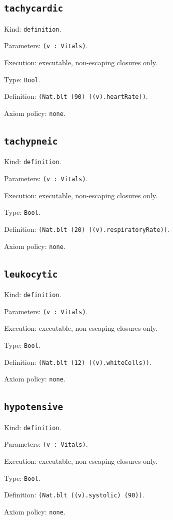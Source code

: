 \documentclass[11pt]{article}
\begin{document}
\subsection*{\texttt{tachycardic}}
\noindent Kind: \texttt{definition}.\par
\noindent Parameters: \texttt{(v : Vitals)}.\par
\noindent Execution: executable, non-escaping closures only.\par
\noindent Type: \texttt{Bool}.\par
\noindent Definition: \texttt{(Nat.blt (90) ((v).heartRate))}.\par
\noindent Axiom policy: \texttt{none}.\par
\subsection*{\texttt{tachypneic}}
\noindent Kind: \texttt{definition}.\par
\noindent Parameters: \texttt{(v : Vitals)}.\par
\noindent Execution: executable, non-escaping closures only.\par
\noindent Type: \texttt{Bool}.\par
\noindent Definition: \texttt{(Nat.blt (20) ((v).respiratoryRate))}.\par
\noindent Axiom policy: \texttt{none}.\par
\subsection*{\texttt{leukocytic}}
\noindent Kind: \texttt{definition}.\par
\noindent Parameters: \texttt{(v : Vitals)}.\par
\noindent Execution: executable, non-escaping closures only.\par
\noindent Type: \texttt{Bool}.\par
\noindent Definition: \texttt{(Nat.blt (12) ((v).whiteCells))}.\par
\noindent Axiom policy: \texttt{none}.\par
\subsection*{\texttt{hypotensive}}
\noindent Kind: \texttt{definition}.\par
\noindent Parameters: \texttt{(v : Vitals)}.\par
\noindent Execution: executable, non-escaping closures only.\par
\noindent Type: \texttt{Bool}.\par
\noindent Definition: \texttt{(Nat.blt ((v).systolic) (90))}.\par
\noindent Axiom policy: \texttt{none}.\par
\end{document}
